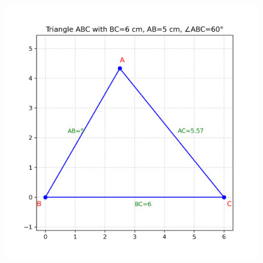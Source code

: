 \documentclass[journal]{IEEEtran}
\begin{document}
\begin{figure}[h!]
    \centering
    \includegraphics[height=0.3\textheight, keepaspectratio]{figs/triangle_solution.png}
    \label{figure_1}
\end{figure}
 
\end{document}
